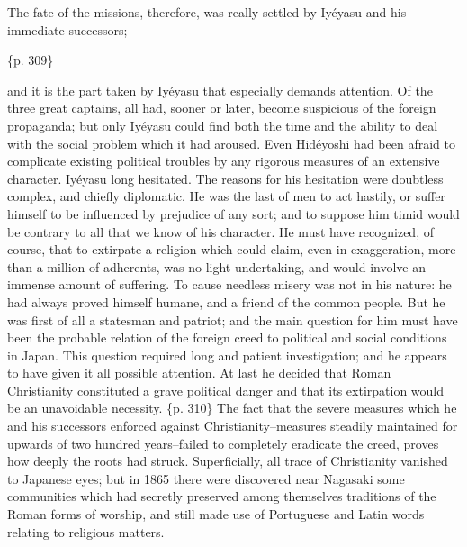 The fate of the missions, therefore, was really settled by Iyéyasu and his immediate successors;

\{p. 309\}

and it is the part taken by Iyéyasu that especially demands attention. Of the three great captains, all had, sooner or later, become suspicious of the foreign propaganda; but only Iyéyasu could find both the time and the ability to deal with the social problem which it had aroused. Even Hidéyoshi had been afraid to complicate existing political troubles by any rigorous measures of an extensive character. Iyéyasu long hesitated. The reasons for his hesitation were doubtless complex, and chiefly diplomatic. He was the last of men to act hastily, or suffer himself to be influenced by prejudice of any sort; and to suppose him timid would be contrary to all that we know of his character. He must have recognized, of course, that to extirpate a religion which could claim, even in exaggeration, more than a million of adherents, was no light undertaking, and would involve an immense amount of suffering. To cause needless misery was not in his nature: he had always proved himself humane, and a friend of the common people. But he was first of all a statesman and patriot; and the main question for him must have been the probable relation of the foreign creed to political and social conditions in Japan. This question required long and patient investigation; and he appears to have given it all possible attention. At last he decided that Roman Christianity constituted a grave political danger and that its extirpation would be an unavoidable necessity. \{p. 310\} The fact that the severe measures which he and his successors enforced against Christianity--measures steadily maintained for upwards of two hundred years--failed to completely eradicate the creed, proves how deeply the roots had struck. Superficially, all trace of Christianity vanished to Japanese eyes; but in 1865 there were discovered near Nagasaki some communities which had secretly preserved among themselves traditions of the Roman forms of worship, and still made use of Portuguese and Latin words relating to religious matters.



